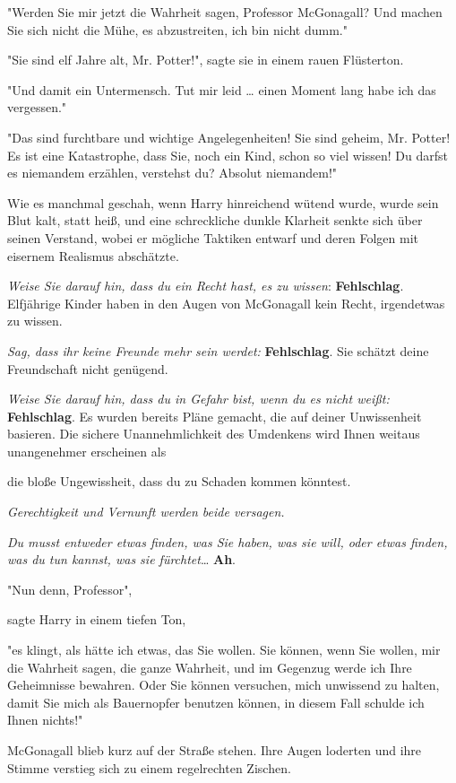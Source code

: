 {"Werden Sie mir jetzt die Wahrheit sagen, Professor McGonagall? Und machen Sie sich nicht die Mühe, es abzustreiten, ich bin nicht dumm."

"Sie sind elf Jahre alt, Mr. Potter!", sagte sie in einem rauen Flüsterton.

"Und damit ein Untermensch. Tut mir leid … einen Moment lang habe ich das vergessen."

"Das sind furchtbare und wichtige Angelegenheiten! Sie sind geheim, Mr. Potter! Es ist eine Katastrophe, dass Sie, noch ein Kind, schon so viel wissen! Du darfst es niemandem erzählen, verstehst du? Absolut niemandem!"

Wie es manchmal geschah, wenn Harry hinreichend wütend wurde, wurde sein Blut kalt, statt heiß, und eine schreckliche dunkle Klarheit senkte sich über seinen Verstand, wobei er mögliche Taktiken entwarf und deren Folgen mit eisernem Realismus abschätzte.

\emph{Weise Sie darauf hin, dass du ein Recht hast, es zu wissen}: \textbf{Fehlschlag}. Elfjährige Kinder haben in den Augen von McGonagall kein Recht, irgendetwas zu wissen.

\emph{Sag, dass ihr keine Freunde mehr sein werdet:} \textbf{Fehlschlag}. Sie schätzt deine Freundschaft nicht genügend.

\emph{Weise Sie darauf hin, dass du in Gefahr bist, wenn du es nicht weißt:} \textbf{Fehlschlag}. Es wurden bereits Pläne gemacht, die auf deiner Unwissenheit basieren. Die sichere Unannehmlichkeit des Umdenkens wird Ihnen weitaus unangenehmer erscheinen als

die bloße Ungewissheit, dass du zu Schaden kommen könntest.

\emph{Gerechtigkeit und Vernunft werden beide versagen.}

\emph{Du musst entweder etwas finden, was Sie haben, was sie will, oder etwas finden, was du tun kannst, was sie fürchtet}… \textbf{Ah}.

"Nun denn, Professor",

sagte Harry in einem tiefen Ton,

"es klingt, als hätte ich etwas, das Sie wollen. Sie können, wenn Sie wollen, mir die Wahrheit sagen, die ganze Wahrheit, und im Gegenzug werde ich Ihre Geheimnisse bewahren. Oder Sie können versuchen, mich unwissend zu halten, damit Sie mich als Bauernopfer benutzen können, in diesem Fall schulde ich Ihnen nichts!"

McGonagall blieb kurz auf der Straße stehen. Ihre Augen loderten und ihre Stimme verstieg sich zu einem regelrechten Zischen.

}
